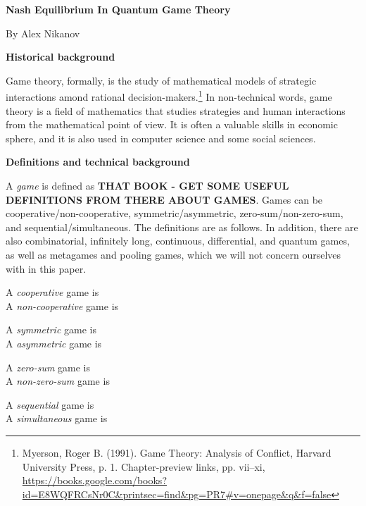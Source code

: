 \documentclass[12pt]{article}
\begin{document}
	\setlength\footnotemargin{10pt}

	\begin{flushleft}
	\textbf{\Large Nash Equilibrium In Quantum Game Theory}	
	
	\medskip	

	By Alex Nikanov

	\bigskip

	\textbf{\large Historical background}

	\medskip	

	Game theory, formally, is the study of mathematical models of strategic interactions amond rational decision-makers.\footnote{Myerson, Roger B. (1991). Game Theory: Analysis of Conflict, Harvard University Press, p. 1. Chapter-preview links, pp. vii–xi, \url{https://books.google.com/books?id=E8WQFRCsNr0C&printsec=find&pg=PR7#v=onepage&q&f=false}} 
	In non-technical words, game theory is a field of mathematics that studies strategies and human interactions from the mathematical point of view. It is often a valuable skills in economic sphere, and it is also used in computer science and some social sciences. 

	\bigskip

	\textbf{\large Definitions and technical background}
	
	\medskip

	A \textit{game} is defined as \textbf{THAT BOOK - GET SOME USEFUL DEFINITIONS FROM THERE ABOUT GAMES}. Games can be cooperative/non-cooperative, symmetric/asymmetric, zero-sum/non-zero-sum, and sequential/simultaneous. The definitions are as follows. In addition, there are also combinatorial, infinitely long, continuous, differential, and quantum games, as well as metagames and pooling games, which we will not concern ourselves with in this paper.

	\medskip
	A \textit{cooperative} game is 
	\\A \textit{non-cooperative} game is
	
	\medskip
	A \textit{symmetric} game is
	\\A \textit{asymmetric} game is 

	\medskip
	A \textit{zero-sum} game is 
	\\A \textit{non-zero-sum} game is
	
	\medskip
	A \textit{sequential} game is 
	\\A \textit{simultaneous} game is

	\bigskip


\end{flushleft}
\end{document}
